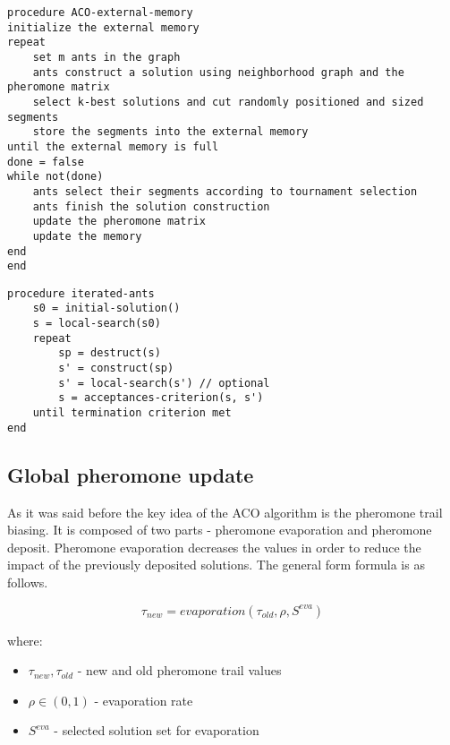 \begin{minipage}[c, breaklines=true]{0.95\textwidth}
\begin{lstlisting}[caption={External memory iteration pseudo-code}, label={lst:ext-mem}]
procedure ACO-external-memory
initialize the external memory
repeat
	set m ants in the graph
	ants construct a solution using neighborhood graph and the pheromone matrix
	select k-best solutions and cut randomly positioned and sized segments
	store the segments into the external memory
until the external memory is full
done = false
while not(done)
	ants select their segments according to tournament selection
	ants finish the solution construction
	update the pheromone matrix
	update the memory
end
end
\end{lstlisting}
\end{minipage}


\begin{minipage}[c, breaklines=true]{0.95\textwidth}
\begin{lstlisting}[caption={General iterated ants pseudo-code}, label={lst:iterated-ants}]
procedure iterated-ants
	s0 = initial-solution()
	s = local-search(s0)
	repeat
		sp = destruct(s)
		s' = construct(sp)
		s' = local-search(s') // optional
		s = acceptances-criterion(s, s')
	until termination criterion met
end
\end{lstlisting}
\end{minipage}



\subsection{Global pheromone update}
As it was said before the key idea of the ACO algorithm is the pheromone trail biasing. It is composed of two parts - pheromone evaporation and pheromone deposit. Pheromone evaporation decreases the values in order to reduce the impact of the previously deposited solutions. The general form formula is as follows.

\begin{equation}
\tau_{new}=evaporation(\tau_{old}, \rho, S^{eva})
\end{equation}

where:
\begin{itemize}
\item $\tau_{new}, \tau_{old}$ - new and old pheromone trail values
\item $\rho \in (0,1)$ - evaporation rate
\item $S^{eva}$ - selected solution set for evaporation
\end{itemize}

